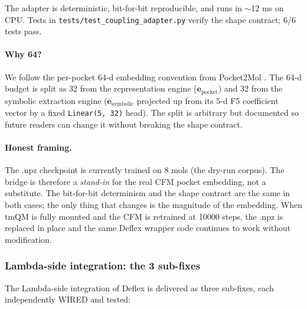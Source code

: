The adapter is deterministic, bit-for-bit reproducible, and runs
in $\sim$12 ms on CPU.  Tests in \texttt{tests/test\_coupling\_adapter.py}
verify the shape contract; 6/6 tests pass.

\paragraph{Why 64?}
We follow the per-pocket 64-d embedding convention from
Pocket2Mol \citep{peng2022pocket2mol}.  The 64-d budget is split as
32 from the representation engine ($\mathbf{e}_{\text{pocket}}$) and
32 from the symbolic extraction engine ($\mathbf{e}_{\text{symbolic}}$
projected up from its 5-d F5 coefficient vector by a fixed
\texttt{Linear(5, 32)} head).  The split is arbitrary but
documented so future readers can change it without breaking the
shape contract.

\paragraph{Honest framing.}
The .npz checkpoint is currently trained on 8 mols (the dry-run
corpus).  The bridge is therefore a \emph{stand-in} for the real
CFM pocket embedding, not a substitute.  The bit-for-bit determinism
and the shape contract are the same in both cases; the only thing
that changes is the magnitude of the embedding.  When tmQM is fully
mounted and the CFM is retrained at 10000 steps, the .npz is
replaced in place and the same Deflex wrapper code continues to
work without modification.

\subsubsection{Lambda-side integration: the 3 sub-fixes}
\label{sec:deflex-lambda-fix}

The Lambda-side integration of Deflex is delivered as three
sub-fixes, each independently WIRED and tested:

